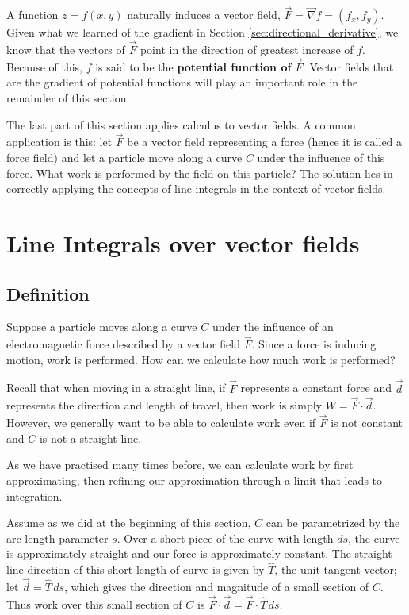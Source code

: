 A function $z=f(x,y)$ naturally induces a vector field, $\vec F = \vec{\nabla} f = \left( f_x,f_y\right)$. Given what we learned of the gradient in Section \ref{sec:directional_derivative}, we know that the vectors of $\vec F$ point in the direction of greatest increase of $f$. Because of this, $f$ is said to be the \textbf{potential function of} $\vec F$. Vector fields that are the gradient of potential functions will play an important role in the remainder of this  section.

The last part of this section applies calculus to vector fields. A common application is this: let $\vec F$ be a vector field representing a force (hence it is called a force field) and let a particle move along a curve $C$ under the influence of this force. What work is performed by the field on this particle? The solution lies in correctly applying the concepts of line integrals in the context of vector fields.

\section{Line Integrals over vector fields}\label{sec:line_int_vf}
\subsection{Definition}
Suppose a particle moves along a curve $C$ under the influence of an electromagnetic force described by a vector field $\vec F$. Since a force is inducing motion, work is performed. How can we calculate how much work is performed?

Recall that when moving in a straight line, if $\vec F$ represents a constant force and $\vec d$ represents the direction and length of travel, then work is simply $W = \vec F\cdot \vec d$. However, we generally want to be able to calculate work even if $\vec F$ is not constant and $C$ is not a straight line.

As we have practised many times before, we can calculate work by first approximating, then refining our approximation through a limit that leads to integration. 

Assume as we did at the beginning of this section, $C$ can be parametrized by the arc length parameter $s$. Over a short piece of the curve with length $ds$, the curve is approximately straight and our force is approximately constant. The straight--line direction of this short length of curve is given by $\widehat T$, the unit tangent vector;   let $\vec d = \widehat T\,ds$, which gives  the direction and magnitude of a small section of $C$. Thus work over this small section of $C$ is $\vec F \cdot \vec d = \vec F\cdot \widehat T\, ds$. 

